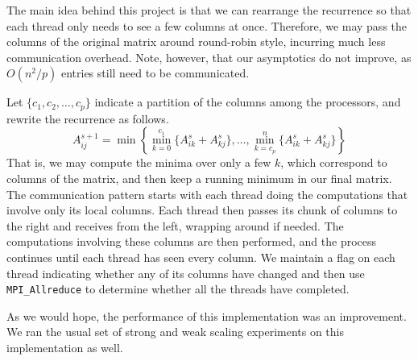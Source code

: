 \documentclass[12pt]{article}
\begin{document}
The main idea behind this project is that we can rearrange the recurrence
so that each thread only needs to see a few columns at once. Therefore,
we may pass the columns of the original matrix around round-robin style,
incurring much less communication overhead. Note, however, that our asymptotics
do not improve, as $O(n^2 / p)$ entries still need to be communicated.

\vspace{0.75em}
\noindent Let $\{ c_1, c_2, \ldots, c_p \}$ indicate a partition of the columns
among the processors, and rewrite the recurrence as follows.
\[ A_{ij}^{s+1} = \min \left\{ \min_{k=0}^{c_1} \{ A_{ik}^s + A_{kj}^s \},
\ldots,
\min_{k=c_p}^{n} \{ A_{ik}^s + A_{kj}^s \} \right\}\]
That is, we may compute the minima over only a few $k$, which correspond
to columns of the matrix, and then keep a running minimum in our final
matrix. The communication pattern starts with each thread doing the computations
that involve only its local columns. Each thread then passes its chunk
of columns to the right and receives from the left, wrapping around if
needed. The computations involving these columns are then performed, and
the process continues until each thread has seen every column. We maintain
a flag on each thread indicating whether any of its columns have changed and
then use {\tt MPI\_Allreduce} to determine whether all the threads have
completed.

\vspace{0.75em}
\noindent As we would hope, the performance of this implementation was an
improvement. We ran the usual set of strong and weak scaling experiments
on this implementation as well.
\end{document}
